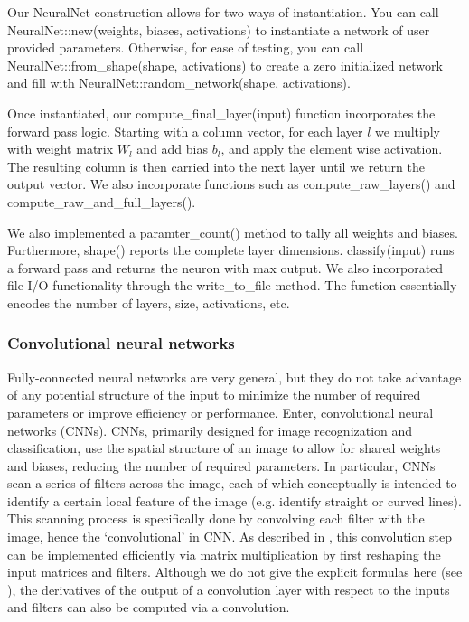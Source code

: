Our NeuralNet construction allows for two ways of instantiation. You can call NeuralNet::new(weights, biases, activations) to instantiate a network of user provided parameters.
Otherwise, for ease of testing, you can call NeuralNet::from\_shape(shape, activations)
to create a zero initialized network and fill with NeuralNet::random\_network(shape, activations).

Once instantiated, our compute\_final\_layer(input) function incorporates the forward pass logic. Starting with a column vector, for each layer 
$l$ we multiply with weight matrix $W_l$ and add bias $b_l$, and apply the element wise activation. The resulting column is then 
carried into the next layer until we return the output vector. We also incorporate functions such as compute\_raw\_layers() and compute\_raw\_and\_full\_layers(). 

We also implemented a paramter\_count() method to tally all weights and biases. Furthermore, shape() reports the complete layer dimensions. 
classify(input) runs a forward pass and returns the neuron with max output. We also incorporated file I/O functionality through the write\_to\_file 
method. The function essentially encodes the number of layers, size, activations, etc.  



\subsubsection{Convolutional neural networks}
Fully-connected neural networks are very general, but they do not take advantage of any potential structure of the input to minimize the number of required parameters or improve efficiency or performance.
Enter, convolutional neural networks (CNNs).
CNNs, primarily designed for image recognization and classification, use the spatial structure of an image to allow for shared weights and biases, reducing the number of required parameters.
In particular, CNNs scan a series of filters across the image, each of which conceptually is intended to identify a certain local feature of the image (e.g. identify straight or curved lines).
This scanning process is specifically done by convolving each filter with the image, hence the `convolutional' in CNN.
As described in \textcolor{blue}{\autocite{Making_faster}}, this convolution step can be implemented efficiently via matrix multiplication by first reshaping the input matrices and filters.
Although we do not give the explicit formulas here (see \textcolor{blue}{\autocite{Solai_2018}}), the derivatives of the output of a convolution layer with respect to the inputs and filters can also be computed via a convolution.

